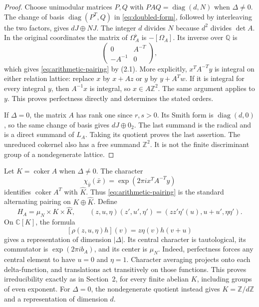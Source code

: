 \documentclass[11pt]{article}
\numberwithin{equation}{section}
\begin{document}
\begin{proof}
Choose unimodular matrices $P,Q$ with $PAQ=\operatorname{diag}(d,N)$
when $\Delta\ne0$.  The change of basis
$\operatorname{diag}(P^T,Q)$ in \eqref{eq:doubled-form}, followed by
interleaving the two factors, gives $dJ\oplus NJ$.
The integer $d$ divides $N$ because $d^2$ divides $\det A$.
In the original coordinates the matrix of $\Omega_A^\flat$ is
$-[\Omega_A]$.  Its inverse over $\mathbb Q$ is
\[
        \begin{pmatrix}0&A^{-T}\\-A^{-1}&0\end{pmatrix},
\]
which gives \eqref{eq:arithmetic-pairing} by (2.1).
More explicitly, $x^TA^{-T}y$ is integral on either relation lattice:
replace $x$ by $x+Az$ or $y$ by $y+A^Tw$.
If it is integral for every integral $y$, then $A^{-1}x$ is integral,
so $x\in A\mathbb Z^2$.  The same argument applies to $y$.
This proves perfectness directly and determines the stated orders.

If $\Delta=0$, the matrix $A$ has rank one since $r,s>0$.
Its Smith form is $\operatorname{diag}(d,0)$, so the same change of
basis gives $dJ\oplus0_2$.  The last summand is the radical and is a
direct summand of $L_A$.  Taking its quotient proves the last assertion.
The unreduced cokernel also has a free summand $\mathbb Z^2$.
It is not the finite discriminant group of a nondegenerate lattice.
\end{proof}

Let $K=\operatorname{coker}A$ when $\Delta\ne0$.
The character
\[
 \chi_{\bar y}(\bar x)=\exp(2\pi i x^TA^{-T}y)
\]
identifies $\operatorname{coker}A^T$ with $\widehat K$.
Thus \eqref{eq:arithmetic-pairing} is the standard alternating pairing
on $K\oplus\widehat K$.
Define
\[
 H_A=\mu_N\times K\times\widehat K,\qquad
 (z,u,\eta)(z',u',\eta')=(zz'\eta'(u),u+u',\eta\eta').
\]
On $\mathbb C[K]$, the formula
\[
                 [\rho(z,u,\eta)h](v)=z\eta(v)h(v+u)
\]
gives a representation of dimension $|\Delta|$.
Its central character is tautological, its commutator is
$\exp(2\pi i b_A)$, and its center is $\mu_N$.
Indeed, perfectness forces any central element to have $u=0$ and
$\eta=1$.  Character averaging projects onto each delta-function,
and translations act transitively on those functions.
This proves irreducibility exactly as in Section~2, for every finite
abelian $K$, including groups of even exponent.
For $\Delta=0$, the nondegenerate quotient instead gives
$K=\mathbb Z/d\mathbb Z$ and a representation of dimension $d$.
\end{document}
